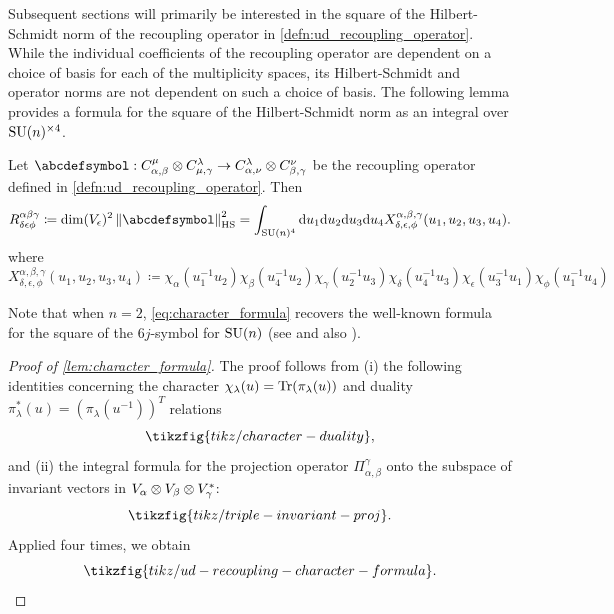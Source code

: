 \documentclass[notitlepage, 10pt]{article}
\begin{document}
Subsequent sections will primarily be interested in the square of the Hilbert-Schmidt norm of the recoupling operator in \cref{defn:ud_recoupling_operator}.
While the individual coefficients of the recoupling operator are dependent on a choice of basis for each of the multiplicity spaces, its Hilbert-Schmidt and operator norms are not dependent on such a choice of basis.
The following lemma provides a formula for the square of the Hilbert-Schmidt norm as an integral over $\operatorname{SU}(n)^{\times 4}$.
\begin{lem}
    \label{lem:character_formula}
    Let $\abcdefsymbol : C^{\mu}_{\alpha,\beta} \ot C^{\lambda}_{\mu,\gamma} \to C^{\lambda}_{\alpha, \nu} \ot C^{\nu}_{\beta,\gamma}$ be the recoupling operator defined in \cref{defn:ud_recoupling_operator}.
    Then
    \begin{equation}
        \label{eq:character_formula}
        R^{\alpha\beta\gamma}_{\delta\epsilon\phi} \coloneqq
        \dim(V_{\epsilon})^{2}\norm{\abcdefsymbol}_{\mathrm{HS}}^{2}
        = \int_{\SU(n)^{4}} \diff u_1 \diff u_2 \diff u_3 \diff u_4 X^{\alpha,\beta,\gamma}_{\delta,\epsilon,\phi}(u_1,u_2,u_3,u_4).
    \end{equation}
    where
    \begin{equation}
        X^{\alpha,\beta,\gamma}_{\delta,\epsilon,\phi}(u_1,u_2,u_3,u_4) \coloneqq \chi_{\alpha}(u_1^{-1}u_2)\chi_{\beta}(u_4^{-1}u_2)\chi_{\gamma}(u_2^{-1}u_3)\chi_{\delta}(u_4^{-1}u_3)\chi_{\epsilon}(u_3^{-1}u_1)\chi_{\phi}(u_1^{-1}u_4)
    \end{equation}
\end{lem}
Note that when $n = 2$, \cref{eq:character_formula} recovers the well-known formula for the square of the $6j$-symbol for $\operatorname{SU}(n)$ (see \cite[Equation (1)]{freidel2003asymptotics} and also \cite{barrett1998classical,freidel2000simple}).
\begin{proof}[Proof of \cref{lem:character_formula}]
    The proof follows from (i) the following identities concerning the character $\chi_{\lambda}(u) = \operatorname{Tr}(\pi_{\lambda}(u))$ and duality $\pi_{\lambda}^{*}(u) = (\pi_{\lambda}(u^{-1}))^{T}$ relations
    \begin{equation}
        \tikzfig{tikz/character-duality},
    \end{equation}
    and (ii) the integral formula for the projection operator $\Pi_{\alpha,\beta}^{\gamma}$ onto the subspace of invariant vectors in $V_{\alpha} \otimes V_{\beta} \otimes V_{\gamma}^{*}$:
    \begin{equation}
        \tikzfig{tikz/triple-invariant-proj}.
    \end{equation}
    Applied four times, we obtain
    \begin{equation}
        \tikzfig{tikz/ud-recoupling-character-formula}.
    \end{equation}
\end{proof}
\end{document}
